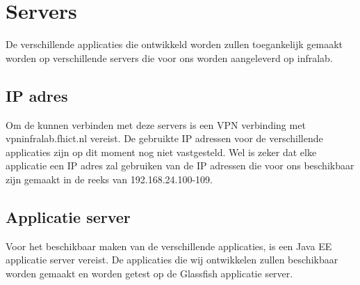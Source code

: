 \section{Servers}
De verschillende applicaties die ontwikkeld worden zullen toegankelijk gemaakt worden op verschillende servers die voor ons worden aangeleverd op infralab.

\subsection{IP adres}

Om de kunnen verbinden met deze servers is een VPN verbinding met vpninfralab.fhict.nl vereist. De gebruikte IP adressen voor de verschillende applicaties zijn op dit moment nog niet vastgesteld. Wel is zeker dat elke applicatie een IP adres zal gebruiken van de IP adressen die voor ons beschikbaar zijn gemaakt in de reeks van 192.168.24.100-109.

\subsection{Applicatie server}
Voor het beschikbaar maken van de verschillende applicaties, is een Java EE applicatie server vereist. De applicaties die wij ontwikkelen zullen beschikbaar worden gemaakt en worden getest op de Glassfish applicatie server.